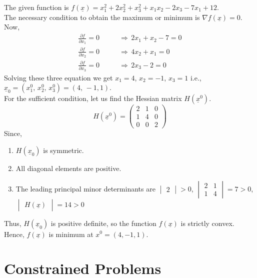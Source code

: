 \documentclass[../main-sheet.tex]{subfiles}
\begin{document}
\begin{soln}
    The given function is \(f(\underline{x})=x_1^2+2x_2^2+x_3^2+x_1x_2-2x_3-7x_1+12\).\\
    The necessary condition to obtain the maximum or minimum is \(\nabla f(\underline{x})=0\).\\ Now,
    \begin{align*}
        \frac{\partial f}{\partial x_1}=0\qquad &\Rightarrow \,2x_1+x_2-7=0\\
        \frac{\partial f}{\partial x_2}=0\qquad &\Rightarrow \,4x_2+x_1=0\\
        \frac{\partial f}{\partial x_3}=0\qquad &\Rightarrow \,2x_3-2=0
    \end{align*}
    Solving these three equation we get \(x_1=4\), \(x_2=-1\), \(x_3=1\) i.e., \(\underline{x}_0=(x_1^0,\,x_2^0,\,x_3^0)=(4,\,-1,1)\).\\
    For the sufficient condition, let us find the Hessian matrix \(H(\underline{x}^0)\).
    \[H(\underline{x}^0)=\begin{pmatrix}
        2&1&0\\
        1&4&0\\
        0&0&2
    \end{pmatrix}
    \]
    Since,
    \begin{enumerate}[label=(\roman*)]
        \item \(H(\underline{x}_0)\) is symmetric.
        \item All diagonal elements are positive.
        \item The leading principal minor determinants are \(\begin{vmatrix}
            2
        \end{vmatrix}>0\), \(\begin{vmatrix}
            2 & 1\\
            1&4
        \end{vmatrix}=7>0\), \(\begin{vmatrix}
            H(\underline{x})
        \end{vmatrix}=14>0\)
    \end{enumerate}
    Thus, \(H(\underline{x}_0)\) is positive definite, so the function \(f(\underline{x})\) is strictly convex. Hence, \(f(\underline{x})\) is minimum at \(x^0=(4,-1,1)\).
\end{soln}
\section{Constrained Problems}
\end{document}

